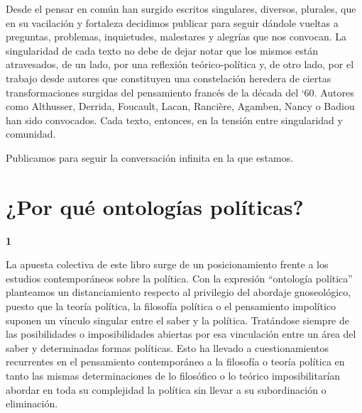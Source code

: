 Desde el pensar en común han surgido escritos singulares, diversos, plurales, que en su vacilación y fortaleza decidimos publicar para seguir dándole vueltas a preguntas, problemas, inquietudes, malestares y alegrías que nos convocan. La singularidad de cada texto no debe de dejar notar que los mismos están atravesados, de un lado, por una reflexión teórico-política y, de otro lado, por el trabajo desde autores que constituyen una constelación heredera de ciertas transformaciones surgidas del pensamiento francés de la década del `60. Autores como Althusser, Derrida, Foucault, Lacan, Rancière, Agamben, Nancy o Badiou han sido convocados. Cada texto, entonces, en la tensión entre singularidad y comunidad.

Publicamos para seguir la conversación infinita en la que estamos.

\chapter[¿Por qué ontologías políticas?]{¿Por qué ontologías políticas?}

\vspace{1em} %
\noindent\textbf{1}

La apuesta colectiva de este libro surge de un posicionamiento frente a los estudios contemporáneos sobre la política. Con la expresión \enquote{ontología política} planteamos un distanciamiento respecto al privilegio del abordaje gnoseológico, puesto que la teoría política, la filosofía política o el pensamiento impolítico suponen un vínculo singular entre el saber y la política. Tratándose siempre de las posibilidades o imposibilidades abiertas por esa vinculación entre un área del saber y determinadas formas políticas. Esto ha llevado a cuestionamientos recurrentes en el pensamiento contemporáneo a la filosofía o teoría política en tanto las mismas determinaciones de lo filosófico o lo teórico imposibilitarían abordar en toda su complejidad la política sin llevar a su subordinación o eliminación.


